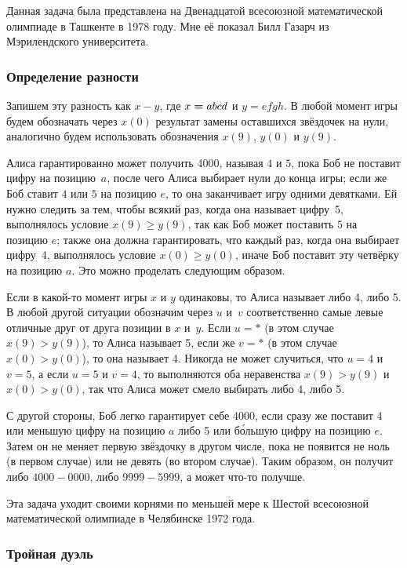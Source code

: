 \documentclass[twoside]{book}
\begin{document}
Данная задача была представлена на Двенадцатой всесоюзной математической олимпиаде в Ташкенте в 1978 году.
Мне её показал Билл Газарч из Мэрилендского университета.%

\subsubsection*{Определение разности}%

Запишем эту разность как $x-y$, где $x\hm=abcd$ и $y=efgh$.
В любой момент игры будем обозначать через $x(0)$ результат замены оставшихся звёздочек на нули, аналогично будем использовать обозначения $x(9)$, $y(0)$ и $y(9)$.

Алиса гарантированно может получить 4000, называя $4$ и $5$, пока Боб не поставит цифру на позицию~$a$, после чего Алиса выбирает нули до конца игры;
если же Боб ставит $4$ или $5$ на позицию $e$, то она заканчивает игру одними девятками.
Ей нужно следить за тем, чтобы всякий раз, когда она называет цифру~5, выполнялось условие $x(9)\ge y(9)$, так как Боб может поставить $5$ на позицию $e$;
также она должна гарантировать, что каждый раз, когда она выбирает цифру~4, выполнялось условие $x(0)\ge y(0)$, иначе Боб поставит эту четвёрку на позицию $a$.
Это можно проделать следующим образом.

Если в какой-то момент игры $x$ и $y$ одинаковы, то Алиса называет либо 4, либо 5.
В любой другой ситуации обозначим через $u$ и~$v$ соответственно самые левые отличные друг от друга позиции в $x$ и~$y$.
Если $u=*$ (в этом случае $x(9)> y(9)$), то Алиса называет 5, если же $v=*$ (в этом случае $x(0)> y(0)$), то она называет 4.
Никогда не может случиться, что $u=4$ и $v=5$, а если $u=5$ и $v=4$, то выполняются оба неравенства $x(9)> y(9)$ и $x(0)> y(0)$, так что Алиса может смело выбирать либо 4, либо 5.

С другой стороны, Боб легко гарантирует себе 4000, если сразу же поставит 4 или меньшую цифру на позицию $a$ либо 5 или б\'{о}льшую цифру на позицию $e$.
Затем он не меняет первую звёздочку в другом числе, пока не появится не ноль (в первом случае) или не девять (во втором случае).
Таким образом, он получит либо $4000-0000$, либо $9999-5999$, а может что-то получше.
\heart

Эта задача уходит своими корнями по меньшей мере к Шестой всесоюзной математической олимпиаде в Челябинске 1972 года.

\subsubsection*{Тройная дуэль}%
\end{document}
